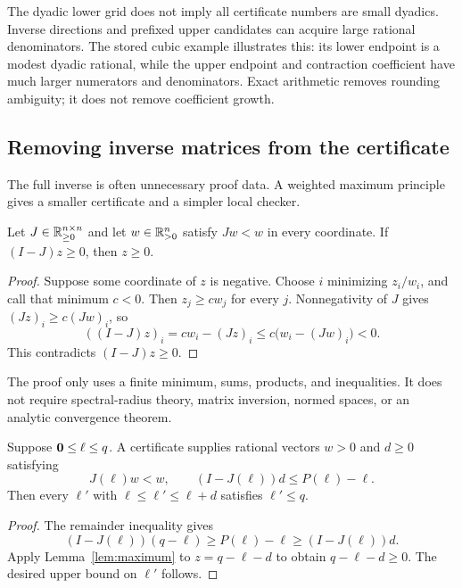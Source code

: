 The dyadic lower grid does not imply all certificate numbers are small dyadics. Inverse directions and prefixed upper candidates can acquire large rational denominators. The stored cubic example illustrates this: its lower endpoint is a modest dyadic rational, while the upper endpoint and contraction coefficient have much larger numerators and denominators. Exact arithmetic removes rounding ambiguity; it does not remove coefficient growth.

\subsection{Removing inverse matrices from the certificate}
The full inverse is often unnecessary proof data. A weighted maximum principle gives a smaller certificate and a simpler local checker.

\begin{lemma}
\label{lem:maximum}
Let $J\in\mathbb R_{\ge0}^{n\times n}$ and let $w\in\mathbb R_{>0}^n$ satisfy $Jw<w$ in every coordinate. If $(I-J)z\ge0$, then $z\ge0$.
\end{lemma}
\begin{proof}
Suppose some coordinate of $z$ is negative. Choose $i$ minimizing $z_i/w_i$, and call that minimum $c<0$. Then $z_j\ge cw_j$ for every $j$. Nonnegativity of $J$ gives $(Jz)_i\ge c(Jw)_i$, so
\[
 ((I-J)z)_i
 =cw_i-(Jz)_i
 \le c\bigl(w_i-(Jw)_i\bigr)<0.
\]
This contradicts $(I-J)z\ge0$.
\end{proof}

The proof only uses a finite minimum, sums, products, and inequalities. It does not require spectral-radius theory, matrix inversion, normed spaces, or an analytic convergence theorem.

\begin{theorem}
\label{thm:weighted-newton}
Suppose $\mathbf 0\le\ell\le q$. A certificate supplies rational vectors $w>0$ and $d\ge0$ satisfying
\begin{equation}
 \label{eq:weighted-step}
 J(\ell)w<w,
 \qquad (I-J(\ell))d\le P(\ell)-\ell.
\end{equation}
Then every $\ell'$ with $\ell\le\ell'\le\ell+d$ satisfies $\ell'\le q$.
\end{theorem}
\begin{proof}
The remainder inequality gives
\[
 (I-J(\ell))(q-\ell)\ge P(\ell)-\ell
 \ge (I-J(\ell))d.
\]
Apply Lemma~\ref{lem:maximum} to $z=q-\ell-d$ to obtain $q-\ell-d\ge0$. The desired upper bound on $\ell'$ follows.
\end{proof}

